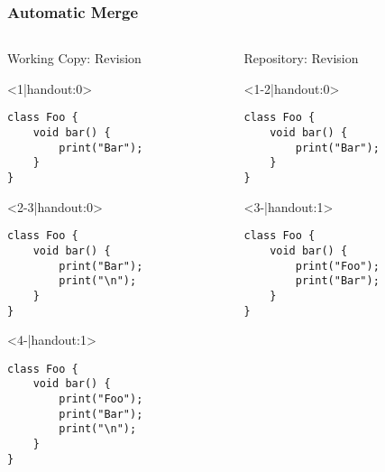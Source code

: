 \begin{frame}[fragile]
	\frametitle{Automatic Merge}	
	\begin{columns}[onlytextwidth]
		\begin{column}{0.6\linewidth}
			\begin{columns}[T]
				\begin{column}{0.5\linewidth}
					Working Copy: Revision \only<4>{\emph{11$^*$}}\\[2mm]
					
					\begin{onlyenv}<1|handout:0>
						\begin{lstlisting}[style=java,basicstyle=\fontfamily{pcr}\small\selectfont,numbers=none,escapechar=|]
class Foo {
	void bar() {
		print("Bar");
	}
}	
						\end{lstlisting}
					\end{onlyenv}
					\begin{onlyenv}
						\begin{lstlisting}[style=java,basicstyle=\fontfamily{pcr}\small\selectfont,numbers=none,escapechar=|]
class Foo {
	void bar() {
		print("Bar");
		print("\n");
	}
}	
						\end{lstlisting}
					\end{onlyenv}
					\begin{onlyenv}
						\begin{lstlisting}[style=java,basicstyle=\fontfamily{pcr}\small\selectfont,numbers=none,escapechar=|]
class Foo {
	void bar() {
		print("Foo");
		print("Bar");
		print("\n");
	}
}	
						\end{lstlisting}
					\end{onlyenv}
				\end{column}
				\begin{column}{0.5\linewidth}					
					Repository: Revision \only<3->{\emph{11}}
					
					\begin{onlyenv}
						\begin{lstlisting}[style=java,basicstyle=\fontfamily{pcr}\small\selectfont,numbers=none,escapechar=|]
class Foo {
	void bar() {
		print("Bar");
	}
}
						\end{lstlisting}
					\end{onlyenv}
					\begin{onlyenv}
						\begin{lstlisting}[style=java,basicstyle=\fontfamily{pcr}\small\selectfont,numbers=none,escapechar=|]
class Foo {
	void bar() {
		print("Foo");
		print("Bar");
	}
}
						\end{lstlisting}
					\end{onlyenv}
				\end{column}
			\end{columns}
			

\end{column}
\end{columns}
\end{frame}
